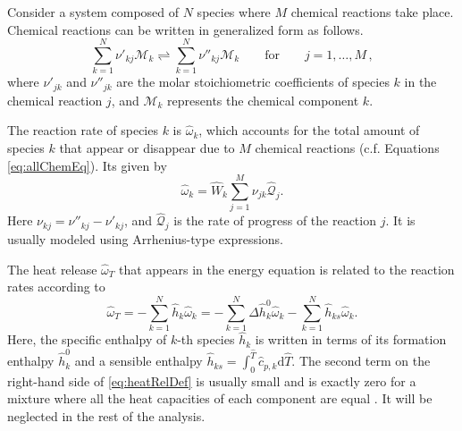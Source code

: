 Consider a system composed of $N$ species where $M$ chemical reactions take place. Chemical reactions can be written in generalized form as follows.
\begin{equation}\label{eq:allChemEq}
	\sum_{k=1}^{N} \nu'_{kj}\mathcal{M}_k  \rightleftharpoons \sum_{k=1}^{N} \nu''_{kj}\mathcal{M}_k  \qquad \text{for}\qquad j=1,\dots,M\, ,
\end{equation}
where $\nu'_{jk}$ and $\nu''_{jk}$ are the molar stoichiometric coefficients of species $k$ in the chemical reaction $j$, and $\mathcal{M}_k$ represents the chemical component $k$. \newline

The reaction rate of species $k$ is $\hat \omega_k$, which accounts for the total amount of species $k$ that appear or disappear due to $M$ chemical reactions (c.f. Equations \eqref{eq:allChemEq}). Its given by
\begin{equation} \label{eq:reacRateDef}
	\hat \omega_k  = \hat W_k \sum_{j=1}^{M}\nu_{jk}\hat{\mathcal{Q}}_j.
\end{equation}
Here $\nu_{kj} = \nu''_{kj} -\nu'_{kj}$, and $\hat{\mathcal{Q}}_j$ is the rate of progress of the reaction $j$. It is usually modeled using Arrhenius-type expressions.\newline

The heat release $\hat \omega_T$ that appears in the energy equation is related to the reaction rates according to
\begin{equation}\label{eq:heatRelDef}
	\hat \omega _T = - \sum_{k=1}^{N} \hat h_k\hat\omega_k = - \sum_{k=1}^{N}   \Delta \hat h_k^0 \hat\omega_k   - \sum_{k=1}^{N} \hat h_{ks} \hat\omega_k.
\end{equation}
Here, the specific enthalpy of $k$-th species $\hat h_k$  is written in terms of its formation enthalpy $\hat h_k^0$ and a sensible enthalpy $\hat h_{ks} =\int_{0}^{\hat{T}} \hat c_{p,k} \text{d}\hat{T} $. The second term on the right-hand side of \cref{eq:heatRelDef} is usually small and is exactly zero for a mixture where all the heat capacities of each component are equal \parencite{poinsotTheoreticalNumericalCombustion2005}. It will be neglected in the rest of the analysis.
\newline

